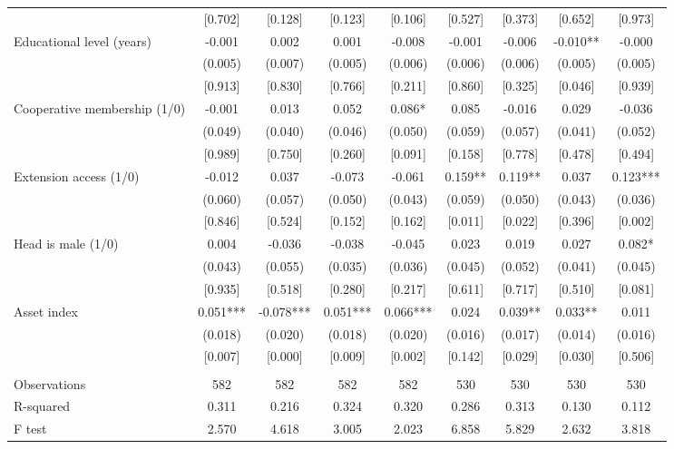 \documentclass[]{article}
\begin{document}
\begin{tabular}{lcccccccc}
 & [0.702] & [0.128] & [0.123] & [0.106] & [0.527] & [0.373] & [0.652] & [0.973] \\
Educational level (years) & -0.001 & 0.002 & 0.001 & -0.008 & -0.001 & -0.006 & -0.010** & -0.000 \\
 & (0.005) & (0.007) & (0.005) & (0.006) & (0.006) & (0.006) & (0.005) & (0.005) \\
 & [0.913] & [0.830] & [0.766] & [0.211] & [0.860] & [0.325] & [0.046] & [0.939] \\
Cooperative membership (1/0) & -0.001 & 0.013 & 0.052 & 0.086* & 0.085 & -0.016 & 0.029 & -0.036 \\
 & (0.049) & (0.040) & (0.046) & (0.050) & (0.059) & (0.057) & (0.041) & (0.052) \\
 & [0.989] & [0.750] & [0.260] & [0.091] & [0.158] & [0.778] & [0.478] & [0.494] \\
Extension access (1/0) & -0.012 & 0.037 & -0.073 & -0.061 & 0.159** & 0.119** & 0.037 & 0.123*** \\
 & (0.060) & (0.057) & (0.050) & (0.043) & (0.059) & (0.050) & (0.043) & (0.036) \\
 & [0.846] & [0.524] & [0.152] & [0.162] & [0.011] & [0.022] & [0.396] & [0.002] \\
Head is male (1/0) & 0.004 & -0.036 & -0.038 & -0.045 & 0.023 & 0.019 & 0.027 & 0.082* \\
 & (0.043) & (0.055) & (0.035) & (0.036) & (0.045) & (0.052) & (0.041) & (0.045) \\
 & [0.935] & [0.518] & [0.280] & [0.217] & [0.611] & [0.717] & [0.510] & [0.081] \\
Asset index & 0.051*** & -0.078*** & 0.051*** & 0.066*** & 0.024 & 0.039** & 0.033** & 0.011 \\
 & (0.018) & (0.020) & (0.018) & (0.020) & (0.016) & (0.017) & (0.014) & (0.016) \\
 & [0.007] & [0.000] & [0.009] & [0.002] & [0.142] & [0.029] & [0.030] & [0.506] \\
 &  &  &  &  &  &  &  &  \\
Observations & 582 & 582 & 582 & 582 & 530 & 530 & 530 & 530 \\
R-squared & 0.311 & 0.216 & 0.324 & 0.320 & 0.286 & 0.313 & 0.130 & 0.112 \\
 F test & 2.570 & 4.618 & 3.005 & 2.023 & 6.858 & 5.829 & 2.632 & 3.818 \\ \hline
\end{tabular}
\end{document}

